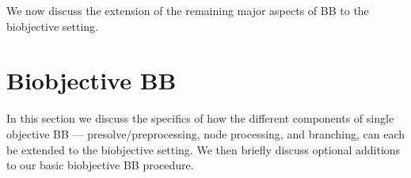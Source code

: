 \documentclass[11.5pt]{article}
\newcommand{\bb}{BB}
\begin{document}

We now discuss the extension of the remaining major aspects of \bb{} to the biobjective setting.

\section{Biobjective BB}\label{sec:multi_BB}
In this section we discuss the specifics of how the different components of single objective BB ---  presolve/preprocessing, node processing, and branching, can each be extended to the biobjective setting. We then briefly discuss optional additions to our basic biobjective BB procedure. %

\end{document}
